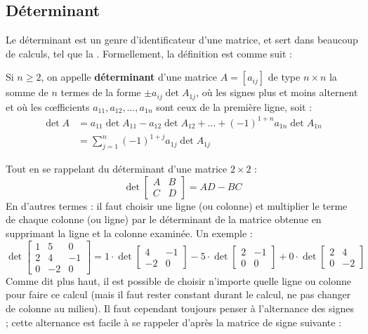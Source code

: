 \documentclass[12pt,a4paper]{article}
\begin{document}
\subsection{Déterminant}
\label{app: determinant}
Le déterminant est un genre d'identificateur d'une matrice, et sert dans beaucoup de calculs, tel que la . Formellement, la définition est comme suit :
\begin{blackbox}
	Si $n\geq 2$, on appelle \textbf{déterminant} d'une matrice $A = [a_{ij}]$ de type $n\times n$ la somme de $n$ termes de la forme $\pm a_{ij} \det A_{1j}$, où les signes plus et moins alternent et où les c\oe fficients $a_{11},a_{12},\ldots,a_{1n}$ sont ceux de la première ligne, soit :
	\[\begin{array}{ll}
		\det A 	&= a_{11} \det A_{11} - a_{12}\det A_{12} + \ldots + (-1)^{1+n} a_{1n}\det A_{1n}\\
				&= \sum_{j=1}^n(-1)^{1+j} a_{1j} \det A_{1j}
	\end{array}\]
\end{blackbox}
Tout en se rappelant du déterminant d'une matrice $2\times 2$ :
\[\det \begin{bmatrix}
	A & B\\
	C & D
\end{bmatrix} = AD - BC\]
En d'autres termes : il faut choisir une ligne (ou colonne) et multiplier le terme de chaque colonne (ou ligne) par le déterminant de la matrice obtenue en supprimant la ligne et la colonne examinée. Un exemple :
\[\det \begin{bmatrix}
	1 & 5 & 0\\
	2 & 4 & -1\\
	0 & -2 & 0
\end{bmatrix} = 1\cdot \det \begin{bmatrix}
4 & -1\\
-2 & 0
\end{bmatrix} - 5\cdot \det \begin{bmatrix}
2 & -1\\
0 & 0
\end{bmatrix} + 0 \cdot \det \begin{bmatrix}
2 & 4\\
0 &-2 
\end{bmatrix}\]
Comme dit plus haut, il est possible de choisir n'importe quelle ligne ou colonne pour faire ce calcul (mais il faut rester constant durant le calcul, ne pas changer de colonne au milieu). Il faut cependant toujours penser à l'alternance des signes ; cette alternance est facile à se rappeler d'après la matrice de signe suivante :
\end{document}
